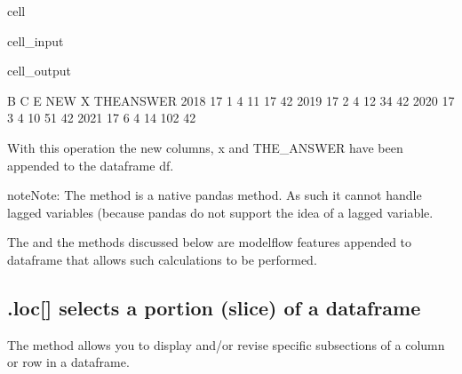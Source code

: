 \documentclass[letterpaper,10pt,english]{jupyterBook}
\begin{document}
\begin{sphinxuseclass}{cell}\begin{sphinxVerbatimInput}

\begin{sphinxuseclass}{cell_input}
\begin{sphinxVerbatim}[commandchars=\\\{\}]
\end{sphinxVerbatim}

\end{sphinxuseclass}\end{sphinxVerbatimInput}
\begin{sphinxVerbatimOutput}

\begin{sphinxuseclass}{cell_output}
\begin{sphinxVerbatim}[commandchars=\\\{\}]
       B  C  E  NEW    X  THE\PYGZus{}ANSWER
2018  17  1  4   11   17          42
2019  17  2  4   12   34          42
2020  17  3  4   10   51          42
2021  17  6  4   14  102          42
\end{sphinxVerbatim}

\end{sphinxuseclass}\end{sphinxVerbatimOutput}

\end{sphinxuseclass}
\sphinxAtStartPar
With this operation the new columns, x and THE\_ANSWER have been appended to the dataframe df.

\begin{sphinxadmonition}{note}{Note:}
\sphinxAtStartPar
The  method is a native pandas method.  As such it cannot handle lagged variables (because pandas do not support the idea of a lagged variable.

\sphinxAtStartPar
The  and the  methods discussed below are modelflow features appended to dataframe that allows such calculations to be performed.
\end{sphinxadmonition}


\subsection{.loc{[}{]} selects a portion (slice) of a dataframe}
\label{\detokenize{content/04_PythonEssentials/PythonPackagesEtc:loc-selects-a-portion-slice-of-a-dataframe}}
\sphinxAtStartPar
The  method allows you to display and/or revise specific sub\sphinxhyphen{}sections of a column or row in a dataframe.
\end{document}

